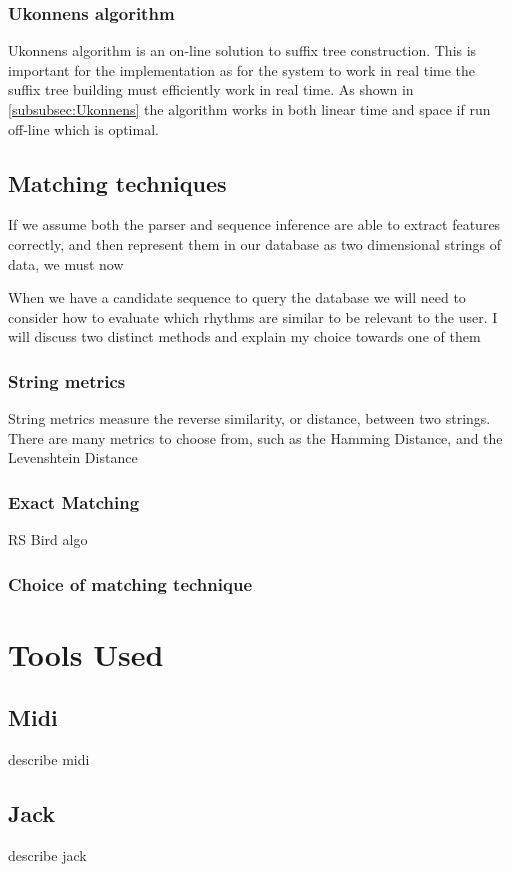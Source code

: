 \documentclass[12pt,twoside,notitlepage]{report}
\begin{document}
			\subsubsection{Ukonnens algorithm}
			Ukonnens algorithm\cite{Ukkonen1995} is an on-line solution to suffix tree construction. This is important for the implementation as for the system to work in real time the suffix tree building must efficiently work in real time. As shown in \ref{subsubsec:Ukonnens} the algorithm works in both linear time and space if run off-line which is optimal.
		\subsection{Matching techniques}

		If we assume both the parser and sequence inference are able to extract features correctly, and then represent them in our database as two dimensional strings of data, we must now 		
		
		When we have a candidate sequence to query the database we will need to consider how to evaluate which rhythms are similar to be relevant to the user. I will discuss two distinct methods and explain my choice towards one of them 
			\subsubsection{String metrics}
			String metrics measure the reverse similarity, or distance, between two strings. There are many metrics to choose from, such as the Hamming Distance\cite{Hamming1950}, and the Levenshtein Distance
			\subsubsection{Exact Matching}
			RS Bird algo
			\subsubsection{Choice of matching technique}
	\section{Tools Used}
		\subsection{Midi}
		describe midi
		\subsection{Jack}
		describe jack
\end{document}
